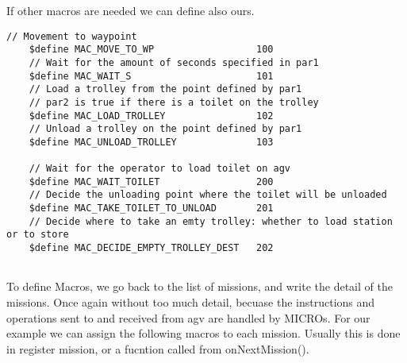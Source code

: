 If other macros are needed we can define also ours.

\begin{lstlisting}[caption= MACRO defined by user]
	// Movement to waypoint
	$define MAC_MOVE_TO_WP					100
	// Wait for the amount of seconds specified in par1
	$define MAC_WAIT_S						101
	// Load a trolley from the point defined by par1
	// par2 is true if there is a toilet on the trolley
	$define MAC_LOAD_TROLLEY				102
	// Unload a trolley on the point defined by par1
	$define MAC_UNLOAD_TROLLEY				103
	
	// Wait for the operator to load toilet on agv
	$define MAC_WAIT_TOILET					200
	// Decide the unloading point where the toilet will be unloaded
	$define MAC_TAKE_TOILET_TO_UNLOAD		201
	// Decide where to take an emty trolley: whether to load station or to store
	$define MAC_DECIDE_EMPTY_TROLLEY_DEST	202
	
\end{lstlisting}

To define Macros, we go back to the list of missions, and write the detail of the missions. Once again without too much detail, becuase the instructions and operations sent to and received from agv are handled by MICROs.
For our example we can assign the following macros to each mission. Usually this is done in register mission, or a fucntion called from onNextMission().

